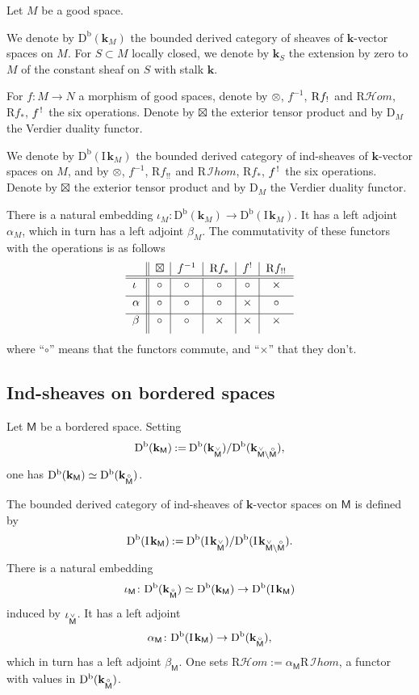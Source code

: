 \documentclass[JEP,XML,SOM,Unicode]{cedram}
\let\mathcal\mathscr
\let\cl\colon
\theoremstyle{plain}
\theoremstyle{definition}
\newcommand{\derived}[1]{\mathrm{#1}}
\newcommand{\derd}{\derived{D}}
\newcommand{\derr}{\derived{R}}
\newcommand{\BDC}{\derd^{\mathrm{b}}}
\newcommand{\roim}[1]{\derr#1_*}
\newcommand{\reim}[1]{\derr#1_{\mspace{.5mu}!}\mspace{2mu}}
\newcommand{\reeim}[1]{\derr#1_{\mspace{1mu}!!}\mspace{1mu}}
\newcommand{\rhom}{{\derr\sheaffont{H}\!om}}
\newcommand{\rihom}{{\derr\mspace{2mu}\shi\!hom}}
\newcommand{\epb}[1]{#1^{\mspace{1.5mu}!}\mspace{2mu}}
\newcommand{\etens}[1][]{\mathbin{\boxtimes_{\raise1.5ex\hbox to-.1em{}#1}}}
\newcommand{\sheaffont}[1]{\mathcal{#1}}
\newcommand\shi{\sheaffont{I}}
\newcommand{\dual}{\mathrm{D}}
\newcommand{\field}{\mathbf{k}}\let\cor\field
\newcommand{\ind}{\mathrm{I}\mspace{2mu}}
\newcommand{\ifield}{\ind\field}
\newcommand{\bclose}[1]{{\accentset{\vee}{#1}}}\let\cc\bclose
\newcommand{\unbordered}[1]{{\accentset{\circ}{#1}}}
\newcommand{\bbM}{\mathsf{M}}
\newcommand{\obM}{\unbordered{\bbM}}
\newcommand{\cbM}{\bclose{\bbM}}
\newcommand{\defeq}{\mathbin{:=}}\let \seteq\defeq
\newcommand{\tens}[1][]{\mathbin{\otimes_{\raise1.5ex\hbox to-.1em{}#1}}}
\newcommand{\opb}[1]{#1^{-1}}
\begin{document}
Let $M$ be a good space.

We denote by $\BDC(\field_M)$ the bounded derived category of sheaves of $\field$-vector spaces on $M$.
For $S\subset M$ locally closed, we denote by $\field_S$ the extension by zero to $M$ of the constant sheaf on $S$ with stalk $\field$.

For $f\colon M\to N$ a morphism of good spaces, denote by $\tens$, $\opb f$, $\reim f$ and $\rhom$, $\roim f$, $\epb f$ the six operations.
Denote by $\etens$ the exterior tensor product and by $\dual_M$ the Verdier duality functor.

We denote by $\BDC(\ifield_M)$ the bounded derived category of ind-sheaves of $\field$-vector spaces on $M$, and by $\tens$, $\opb f$, $\reeim f$ and $\rihom$, $\roim f$, $\epb f$ the six operations.
Denote by $\etens$ the exterior tensor product and by $\dual_M$ the Verdier duality functor.

There is a natural embedding $\iota_M\colon\BDC(\field_M)\to\BDC(\ifield_M)$. It has a left adjoint $\alpha_M$, which in turn has a left adjoint $\beta_M$.
The commutativity of these functors with the operations is as follows
\begin{equation}\label{eq:table}
\begin{tabular}{l||c|c|c|c|c}
{} & $\etens$ & $f^{-1}$ & $\roim f$ & $f^!$ & $\reeim f$ \\ \hline \hline
$\underset{}{\iota}$ & $\circ$ & $\circ$ & $\circ$ & $\circ$ & $\times$ \\ \hline
$\underset{}{\alpha}$ & $\circ$ & $\circ$ & $\circ$ & $\times$ & $\circ$ \\ \hline
$\underset{}{\beta}$ & $\circ$ & $\circ$ & $\times$ & $\times$ & $\times$
\end{tabular}
\end{equation}
where ``$\circ$'' means that the functors commute,
and ``$\times$'' that they don't.

\subsection{Ind-sheaves on bordered spaces}

Let $\bbM$ be a bordered space. Setting
\[
\BDC(\field_\bbM)\defeq \BDC(\field_\cbM)/\BDC(\field_{\cbM\setminus\obM}),
\]
one has $\BDC(\field_\bbM)\simeq\BDC(\field_\obM)$.

The bounded derived category of ind-sheaves of $\field$-vector spaces on $\bbM$ is defined by
\[
\BDC(\ifield_\bbM)\defeq \BDC(\ifield_\cbM)/\BDC(\ifield_{\cbM\setminus\obM}).
\]
There is a natural embedding \[\iota_\bbM\colon\BDC(\field_\obM)\simeq\BDC(\field_\bbM)\to\BDC(\ifield_\bbM)\] induced by $\iota_\cbM$. It has a left adjoint
\[\alpha_\bbM\cl \BDC(\ifield_\bbM)\to \BDC(\field_\obM),\]
which in turn has a left adjoint $\beta_\bbM$.
One sets
$\rhom\defeq\alpha_\bbM\rihom$, a functor with values in $\BDC(\field_\obM)$.
\end{document}
